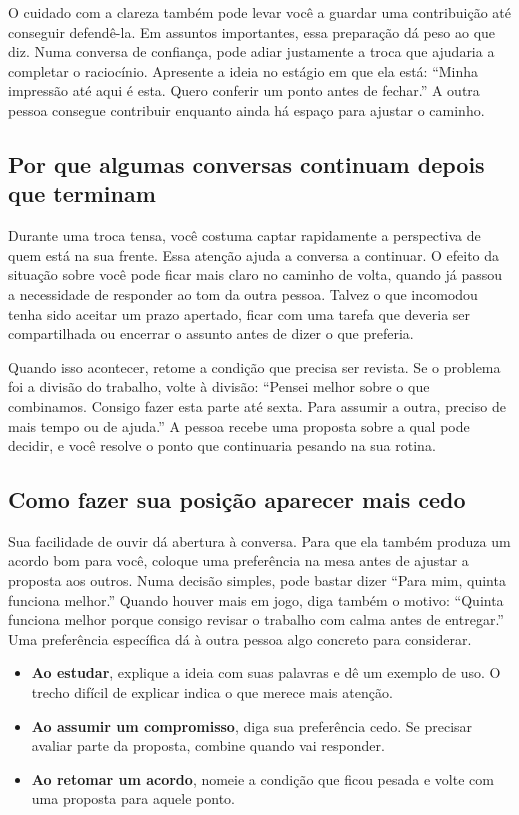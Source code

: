 O cuidado com a clareza também pode levar você a guardar uma contribuição até conseguir defendê-la. Em assuntos importantes, essa preparação dá peso ao que diz. Numa conversa de confiança, pode adiar justamente a troca que ajudaria a completar o raciocínio. Apresente a ideia no estágio em que ela está: “Minha impressão até aqui é esta. Quero conferir um ponto antes de fechar.” A outra pessoa consegue contribuir enquanto ainda há espaço para ajustar o caminho.

\subsection*{Por que algumas conversas continuam depois que terminam}

Durante uma troca tensa, você costuma captar rapidamente a perspectiva de quem está na sua frente. Essa atenção ajuda a conversa a continuar. O efeito da situação sobre você pode ficar mais claro no caminho de volta, quando já passou a necessidade de responder ao tom da outra pessoa. Talvez o que incomodou tenha sido aceitar um prazo apertado, ficar com uma tarefa que deveria ser compartilhada ou encerrar o assunto antes de dizer o que preferia.

Quando isso acontecer, retome a condição que precisa ser revista. Se o problema foi a divisão do trabalho, volte à divisão: “Pensei melhor sobre o que combinamos. Consigo fazer esta parte até sexta. Para assumir a outra, preciso de mais tempo ou de ajuda.” A pessoa recebe uma proposta sobre a qual pode decidir, e você resolve o ponto que continuaria pesando na sua rotina.

\subsection*{Como fazer sua posição aparecer mais cedo}

Sua facilidade de ouvir dá abertura à conversa. Para que ela também produza um acordo bom para você, coloque uma preferência na mesa antes de ajustar a proposta aos outros. Numa decisão simples, pode bastar dizer “Para mim, quinta funciona melhor.” Quando houver mais em jogo, diga também o motivo: “Quinta funciona melhor porque consigo revisar o trabalho com calma antes de entregar.” Uma preferência específica dá à outra pessoa algo concreto para considerar.

\begin{itemize}
\item \textbf{Ao estudar}, explique a ideia com suas palavras e dê um exemplo de uso. O trecho difícil de explicar indica o que merece mais atenção.
\item \textbf{Ao assumir um compromisso}, diga sua preferência cedo. Se precisar avaliar parte da proposta, combine quando vai responder.
\item \textbf{Ao retomar um acordo}, nomeie a condição que ficou pesada e volte com uma proposta para aquele ponto.
\end{itemize}

